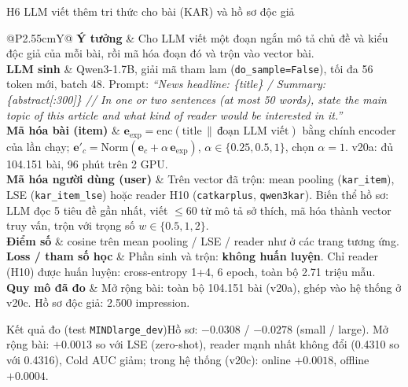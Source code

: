 \documentclass[aspectratio=169,t]{beamer}
\makeatletter
\newcommand{\code}[1]{\texttt{#1}}
\newcommand{\bangmota}[1]{{\scriptsize\renewcommand{\arraystretch}{1.1}\setlength{\tabcolsep}{4pt}%
  \begin{tabularx}{\textwidth}{@{}P{2.55cm}Y@{}}\toprule #1 \bottomrule\end{tabularx}}}
\newcommand{\rw}[2]{\textbf{#1} & #2\\ \midrule}
\newcommand{\rwl}[2]{\textbf{#1} & #2\\}
\newcommand{\ketqua}[1]{\begin{exampleblock}{Kết quả đo (test \code{MINDlarge\_dev})}\scriptsize #1\end{exampleblock}}
\makeatother
\begin{document}
\begin{frame}[shrink]{H6 \textperiodcentered{} LLM viết thêm tri thức cho bài (KAR) và hồ sơ độc giả}
\bangmota{
\rw{Ý tưởng}{Cho LLM viết một đoạn ngắn mô tả chủ đề và kiểu độc giả của mỗi bài, rồi mã hóa đoạn đó và trộn vào vector bài.}
\rw{LLM sinh}{Qwen3-1.7B, giải mã tham lam (\code{do\_sample=False}), tối đa 56 token mới, batch 48. Prompt: \textit{``News headline: \{title\} / Summary: \{abstract[:300]\} // In one or two sentences (at most 50 words), state the main topic of this article and what kind of reader would be interested in it.''}}
\rw{Mã hóa bài (item)}{$\mathbf e_{\mathrm{exp}}=\mathrm{enc}(\text{title}\,\|\,\text{đoạn LLM viết})$ bằng chính encoder của lần chạy; $\mathbf e'_c=\mathrm{Norm}(\mathbf e_c+\alpha\,\mathbf e_{\mathrm{exp}})$, $\alpha\in\{0.25,0.5,1\}$, chọn \textbf{$\alpha=1$}. v20a: đủ 104.151 bài, 96 phút trên 2 GPU.}
\rw{Mã hóa người dùng (user)}{Trên vector đã trộn: mean pooling (\code{kar\_item}), LSE (\code{kar\_item\_lse}) hoặc reader H10 (\code{catkarplus}, \code{qwen3kar}). Biến thể hồ sơ: LLM đọc 5 tiêu đề gần nhất, viết $\le60$ từ mô tả sở thích, mã hóa thành vector truy vấn, trộn với trọng số $w\in\{0.5,1,2\}$.}
\rw{Điểm số}{cosine trên mean pooling / LSE / reader như ở các trang tương ứng.}
\rw{Loss / tham số học}{Phần sinh và trộn: \textbf{không huấn luyện}. Chỉ reader (H10) được huấn luyện: cross-entropy 1+4, 6 epoch, toàn bộ 2.71 triệu mẫu.}
\rwl{Quy mô đã đo}{Mở rộng bài: toàn bộ 104.151 bài (v20a), ghép vào hệ thống ở v20c. Hồ sơ độc giả: 2.500 impression.}
}
\ketqua{Hồ sơ: $-0.0308$ / $-0.0278$ (small / large). Mở rộng bài: $+0.0013$ so với LSE (zero-shot), reader mạnh nhất không đổi (0.4310 so với 0.4316), Cold AUC giảm; trong hệ thống (v20c): online $+0.0018$, offline $+0.0004$.}
\par\kern0pt
\end{frame}
\end{document}
